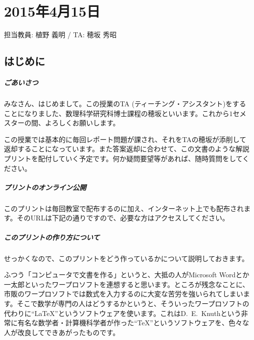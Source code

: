 \chapter{2015年4月15日}

\begin{flushright}
担当教員: 植野 義明 / TA: 穂坂 秀昭
\end{flushright}

\section{はじめに}

\paragraph{ごあいさつ}

みなさん、はじめまして。この授業のTA (ティーチング・アシスタント)をすることになりました、数理科学研究科博士課程の穂坂といいます。これから$1$セメスターの間、よろしくお願いします。

この授業では基本的に毎回レポート問題が課され、それをTAの穂坂が添削して返却することになっています。また答案返却に合わせて、この文書のような解説プリントを配付していく予定です。何か疑問要望等があれば、随時質問をしてください。

\paragraph{プリントのオンライン公開}

このプリントは毎回教室で配布するのに加え、インターネット上でも配布されます。そのURLは下記の通りですので、必要な方はアクセスしてください。

\paragraph{このプリントの作り方について}

せっかくなので、このプリントをどう作っているかについて説明しておきます。

ふつう「コンピュータで文書を作る」というと、大抵の人がMicrosoft Wordとか一太郎といったワープロソフトを連想すると思います。ところが残念なことに、市販のワープロソフトでは数式を入力するのに大変な苦労を強いられてしまいます。そこで数学が専門の人はどうするかというと、そういったワープロソフトの代わりに``\LaTeX''というソフトウェアを使います。これはD.~E.~Knuthという非常に有名な数学者・計算機科学者が作った``\TeX''というソフトウェアを、色々な人が改良してできあがったものです。

